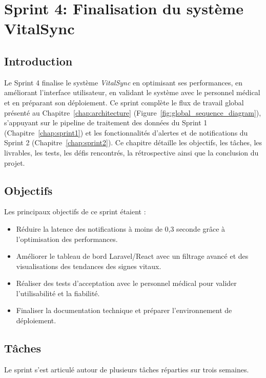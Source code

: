\chapter{Sprint 4: Finalisation du système VitalSync}
\label{chap:sprint4}

\section*{Introduction}
Le Sprint 4 finalise le système \textit{VitalSync} en optimisant ses performances, en améliorant l'interface utilisateur, en validant le système avec le personnel médical et en préparant son déploiement. Ce sprint complète le flux de travail global présenté au Chapitre~\ref{chap:architecture} (Figure~\ref{fig:global_sequence_diagram}), s'appuyant sur le pipeline de traitement des données du Sprint 1 (Chapitre~\ref{chap:sprint1}) et les fonctionnalités d'alertes et de notifications du Sprint 2 (Chapitre~\ref{chap:sprint2}). Ce chapitre détaille les objectifs, les tâches, les livrables, les tests, les défis rencontrés, la rétrospective ainsi que la conclusion du projet.

\section{Objectifs}
Les principaux objectifs de ce sprint étaient :
\begin{itemize}
    \item Réduire la latence des notifications à moins de 0,3 seconde grâce à l'optimisation des performances.
    \item Améliorer le tableau de bord Laravel/React avec un filtrage avancé et des visualisations des tendances des signes vitaux.
    \item Réaliser des tests d'acceptation avec le personnel médical pour valider l'utilisabilité et la fiabilité.
    \item Finaliser la documentation technique et préparer l'environnement de déploiement.
\end{itemize}

\section{Tâches}
Le sprint s'est articulé autour de plusieurs tâches réparties sur trois semaines.

